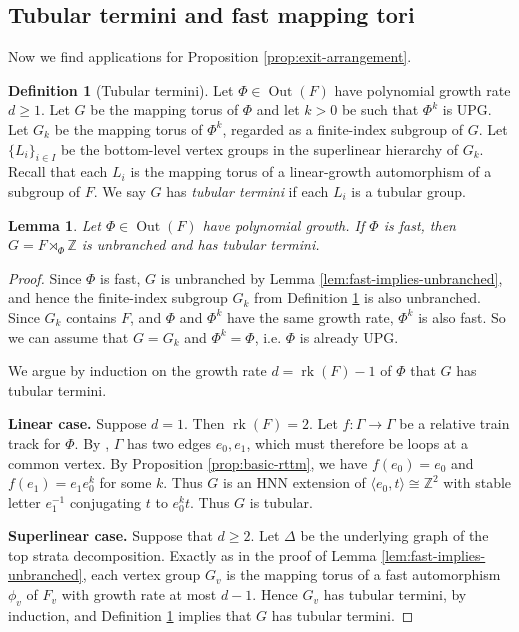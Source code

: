 \documentclass[11pt,oneside]{amsart}
\newtheorem{lem}[thm]{Lemma}
\theoremstyle{definition}
\newtheorem{defn}[thm]{Definition}
\DeclareMathOperator{\rank}{rk}
\DeclareMathOperator{\Out}{Out}
\newcommand{\field}[1]{\mathbb{#1}}
\newcommand{\integers}{\ensuremath{\field{Z}}}
\begin{document}
\subsection{Tubular termini and fast mapping tori}\label{subsec:tubular-termini}
Now we find applications for Proposition \ref{prop:exit-arrangement}.

\begin{defn}[Tubular termini]\label{defn:virtually-tubular-termini}
Let $\Phi\in\Out(F)$ have polynomial growth rate $d\geq 1$.  Let $G$ be the mapping torus of $\Phi$ and let $k>0$ be such that $\Phi^k$ is UPG.  Let $G_k$ be the mapping torus of $\Phi^k$, regarded as a finite-index subgroup of $G$.  Let $\{L_i\}_{i\in I}$ be the bottom-level vertex groups in the superlinear hierarchy of $G_k$.  Recall that each $L_i$ is the mapping torus of a linear-growth automorphism of a subgroup of $F$.  We say $G$ has \emph{tubular termini} if each $L_i$ is  a tubular group.
\end{defn}

\begin{lem}\label{lem:fast-tubular}
Let $\Phi\in\Out(F)$ have polynomial growth.  If $\Phi$ is fast, then $G=F\rtimes_\Phi\integers$ is unbranched and has tubular termini.
\end{lem}

\begin{proof}
Since $\Phi$ is fast, $G$ is unbranched by Lemma \ref{lem:fast-implies-unbranched}, and hence the finite-index subgroup $G_k$ from Definition \ref{defn:virtually-tubular-termini} is also unbranched. Since $G_k$ contains $F$, and $\Phi$ and $\Phi^k$ have the same growth rate, $\Phi^k$ is also fast.  So we can assume that $G=G_k$ and $\Phi^k=\Phi$, i.e. $\Phi$ is already UPG.  

We argue by induction on the growth rate $d=\rank(F)-1$ of $\Phi$ that $G$ has tubular termini.

\textbf{Linear case.}  Suppose $d=1$.  Then $\rank(F)=2$.  Let $f:\Gamma\to\Gamma$ be a relative train track for $\Phi$.  By \cite[Thm. 1.1]{BFH:kolchin},  $\Gamma$ has two edges $e_0,e_1$, which must therefore be loops at a common vertex.  By Proposition \ref{prop:basic-rttm}, we have $f(e_0)=e_0$ and $f(e_1)=e_1e_0^k$ for some $k$.  Thus $G$ is an HNN extension of $\langle e_0,t\rangle\cong\integers^2$ with stable letter $e_1^{-1}$ conjugating $t$ to $e_0^kt$.  Thus $G$ is tubular.


\textbf{Superlinear case.}  Suppose that $d\geq 2$.  Let $\Delta$ be the underlying graph of the top strata decomposition.  Exactly as in the proof of Lemma \ref{lem:fast-implies-unbranched}, each vertex group $G_v$ is the mapping torus of a fast automorphism $\phi_v$ of $F_v$ with growth rate at most $d-1$.  Hence $G_v$ has tubular termini, by induction, and Definition \ref{defn:virtually-tubular-termini} implies that $G$ has tubular termini.
\end{proof}
\end{document}
